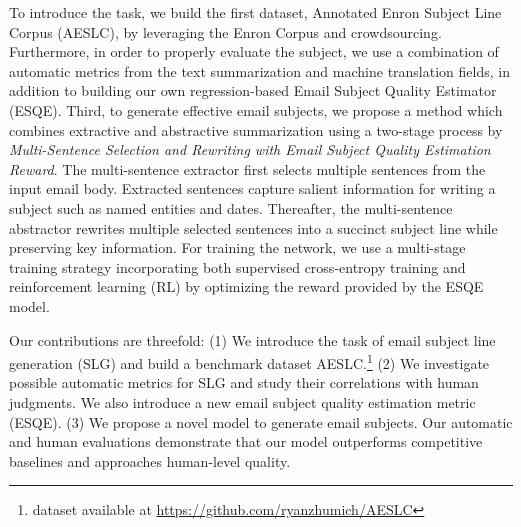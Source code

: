 \documentclass[11pt,a4paper]{article}
\newcommand{\esqe}{{\sc ESQE}\xspace}
\begin{document}
\begin{table*}[ht!]
\centering
{}
\caption{Annotated Enron Subject Line Corpus compared with other datasets.}
\vspace{-3mm}
\label{tab:data}
\end{table*}

To introduce the task, we build the first dataset, Annotated Enron Subject Line Corpus (AESLC), by leveraging the Enron Corpus \cite{klimt2004enron} and crowdsourcing.
Furthermore, in order to properly evaluate the subject, we use a combination of automatic metrics from the text summarization and machine translation fields, in addition to building our own regression-based Email Subject Quality Estimator (\esqe).
Third, to generate effective email subjects, we propose a method which combines extractive and abstractive summarization using a two-stage process by \textit{Multi-Sentence Selection and Rewriting with Email Subject Quality Estimation Reward}.
The multi-sentence extractor first selects multiple sentences from the input email body.
Extracted sentences capture salient information for writing a subject such as named entities and dates.
Thereafter, the multi-sentence abstractor rewrites multiple selected sentences into a succinct subject line while preserving key information.
For training the network, we use a multi-stage training strategy incorporating both supervised cross-entropy training and reinforcement learning (RL) by optimizing the reward provided by the \esqe model.

Our contributions are threefold: (1) We introduce the task of email subject line generation (SLG) and build a benchmark dataset AESLC.\footnote{dataset available at \url{https://github.com/ryanzhumich/AESLC}}  (2) We investigate possible automatic metrics for SLG and study their correlations with human judgments.  We also introduce a new email subject quality estimation metric (\esqe). (3) We propose a novel model to generate email subjects. Our automatic and human evaluations demonstrate that our model outperforms competitive baselines and approaches human-level quality.
\end{document}
